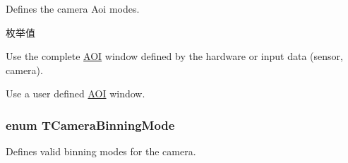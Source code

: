Defines the camera Aoi modes. 

\begin{Desc}
\item[枚举值]\par
\begin{description}
\item[{\em 
\hypertarget{group___device_specific_interface_ggaab13c0272df6eebe71ee4b8f45796cd3a83bae4f63a78a137a81e13558624c02d}{cam\+Full}\label{group___device_specific_interface_ggaab13c0272df6eebe71ee4b8f45796cd3a83bae4f63a78a137a81e13558624c02d}
}]Use the complete \hyperlink{struct_a_o_i}{A\+O\+I} window defined by the hardware or input data (sensor, camera). \item[{\em 
\hypertarget{group___device_specific_interface_ggaab13c0272df6eebe71ee4b8f45796cd3a4801924ec81e812e0ddf9d7bd6ef12e9}{cam\+User}\label{group___device_specific_interface_ggaab13c0272df6eebe71ee4b8f45796cd3a4801924ec81e812e0ddf9d7bd6ef12e9}
}]Use a user defined \hyperlink{struct_a_o_i}{A\+O\+I} window. \end{description}
\end{Desc}
\hypertarget{group___device_specific_interface_ga915d7e18807e69567ac466541b66313b}{
\subsubsection[{T\+Camera\+Binning\+Mode}]{\setlength{\rightskip}{0pt plus 5cm}enum {\bf T\+Camera\+Binning\+Mode}}}\label{group___device_specific_interface_ga915d7e18807e69567ac466541b66313b}


Defines valid binning modes for the camera. 

